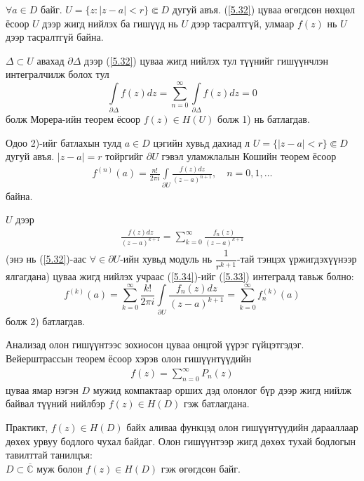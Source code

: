 \begin{prf}
$\forall a\in D$ байг. $U=\{z:|z-a|<r\}\Subset D$ дугуй авъя. (\ref{5.32}) цуваа өгөгдсөн нөхцөл ёсоор $U$ дээр жигд нийлэх ба гишүүд нь $U$ дээр тасралтгүй, улмаар $f(z)$ нь $U$ дээр тасралтгүй байна.

$\Delta \subset U$ авахад $\partial \Delta$ дээр (\ref{5.32}) цуваа жигд нийлэх тул түүнийг гишүүнчлэн интегралчилж болох тул
$$\int\limits_{\partial \Delta}f(z)dz=\sum\limits_{n=0}^\infty \int\limits_{\partial \Delta}f(z)dz=0$$
болж Морера-ийн теорем ёсоор $f(z)\in H(U)$ болж 1) нь батлагдав.

Одоо 2)-ийг батлахын тулд $a\in D$ цэгийн хувьд дахиад л $U=\{|z-a|<r\}\Subset D$ дугуй авъя. $|z-a|=r$ тойргийг $\partial U$ гэвэл уламжлалын Кошийн теорем ёсоор
\begin{eqnarray} \label{5.33}
     f^{(n)}(a)=\frac{n!}{2\pi i}\int\limits_{\partial U} \frac{f(z)dz}{(z-a)^{n+1}}, \quad n=0,1,\ldots
\end{eqnarray}
байна. 

$U$ дээр 
\begin{eqnarray} \label{5.34}
     \frac{f(z)dz}{(z-a)^{k+1}}=\sum\limits_{k=0}^\infty \frac{f_n(z)}{(z-a)^{k+1}}
\end{eqnarray}
(энэ нь (\ref{5.32})-аас $\forall \in\partial U$-ийн хувьд модуль нь $\dfrac{1}{r^{k+1}}$-тай тэнцэх үржигдэхүүнээр ялгагдана) цуваа жигд нийлэх учраас (\ref{5.34})-ийг (\ref{5.33}) интегралд тавьж болно:
$$f^{(k)}(a)= \sum\limits_{k=0}^\infty \frac{k!}{2\pi i} \int\limits_{\partial U} \frac{f_{n}(z)dz}{(z-a)^{k+1}}=\sum\limits_{k=0}^\infty f_n^{(k)}(a)$$ болж 2) батлагдав. 
 \end{prf}

Анализад олон гишүүнтээс зохиосон цуваа онцгой үүрэг гүйцэтгэдэг. Вейерштрассын теорем ёсоор хэрэв олон гишүүнтүүдийн 
\begin{eqnarray}
     f(z)=\sum\limits_{n=0}^\infty P_n(z)
\end{eqnarray}
цуваа ямар нэгэн $D$ мужид компактаар орших дэд олонлог бүр дээр жигд нийлж байвал түүний нийлбэр $f(z)\in H(D)$ гэж батлагдана.

Практикт, $f(z)\in H(D)$ байх аливаа функцэд олон гишүүнтүүдийн дарааллаар дөхөх урвуу бодлого чухал байдаг. Олон гишүүнтээр жигд дөхөх тухай бодлогын тавилттай танилцъя:\\
$D\subset \overline{\mathbb{C}}$ муж болон $f(z)\in H(D)$ гэж өгөгдсөн байг.

